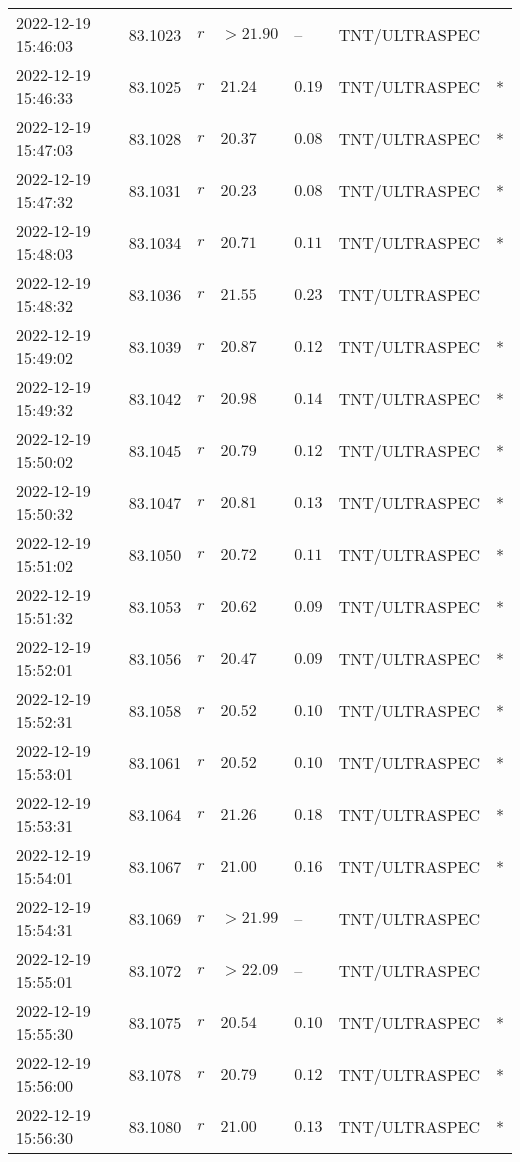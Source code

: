 \documentclass{nature_plusfigure}
\begin{document}
\begin{supplement}
\begin{center}
\begin{longtable}{lllllll}
2022-12-19 15:46:03 & 83.1023 & $r$ & $>21.90$ & -- & TNT/ULTRASPEC &  \\ 
2022-12-19 15:46:33 & 83.1025 & $r$ & $21.24$ & $0.19$ & TNT/ULTRASPEC & * \\ 
2022-12-19 15:47:03 & 83.1028 & $r$ & $20.37$ & $0.08$ & TNT/ULTRASPEC & * \\ 
2022-12-19 15:47:32 & 83.1031 & $r$ & $20.23$ & $0.08$ & TNT/ULTRASPEC & * \\ 
2022-12-19 15:48:03 & 83.1034 & $r$ & $20.71$ & $0.11$ & TNT/ULTRASPEC & * \\ 
2022-12-19 15:48:32 & 83.1036 & $r$ & $21.55$ & $0.23$ & TNT/ULTRASPEC &  \\ 
2022-12-19 15:49:02 & 83.1039 & $r$ & $20.87$ & $0.12$ & TNT/ULTRASPEC & * \\ 
2022-12-19 15:49:32 & 83.1042 & $r$ & $20.98$ & $0.14$ & TNT/ULTRASPEC & * \\ 
2022-12-19 15:50:02 & 83.1045 & $r$ & $20.79$ & $0.12$ & TNT/ULTRASPEC & * \\ 
2022-12-19 15:50:32 & 83.1047 & $r$ & $20.81$ & $0.13$ & TNT/ULTRASPEC & * \\ 
2022-12-19 15:51:02 & 83.1050 & $r$ & $20.72$ & $0.11$ & TNT/ULTRASPEC & * \\ 
2022-12-19 15:51:32 & 83.1053 & $r$ & $20.62$ & $0.09$ & TNT/ULTRASPEC & * \\ 
2022-12-19 15:52:01 & 83.1056 & $r$ & $20.47$ & $0.09$ & TNT/ULTRASPEC & * \\ 
2022-12-19 15:52:31 & 83.1058 & $r$ & $20.52$ & $0.10$ & TNT/ULTRASPEC & * \\ 
2022-12-19 15:53:01 & 83.1061 & $r$ & $20.52$ & $0.10$ & TNT/ULTRASPEC & * \\ 
2022-12-19 15:53:31 & 83.1064 & $r$ & $21.26$ & $0.18$ & TNT/ULTRASPEC & * \\ 
2022-12-19 15:54:01 & 83.1067 & $r$ & $21.00$ & $0.16$ & TNT/ULTRASPEC & * \\ 
2022-12-19 15:54:31 & 83.1069 & $r$ & $>21.99$ & -- & TNT/ULTRASPEC &  \\ 
2022-12-19 15:55:01 & 83.1072 & $r$ & $>22.09$ & -- & TNT/ULTRASPEC &  \\ 
2022-12-19 15:55:30 & 83.1075 & $r$ & $20.54$ & $0.10$ & TNT/ULTRASPEC & * \\ 
2022-12-19 15:56:00 & 83.1078 & $r$ & $20.79$ & $0.12$ & TNT/ULTRASPEC & * \\ 
2022-12-19 15:56:30 & 83.1080 & $r$ & $21.00$ & $0.13$ & TNT/ULTRASPEC & * \\ 

\end{longtable}
\end{center}
\end{supplement}
\end{document}
